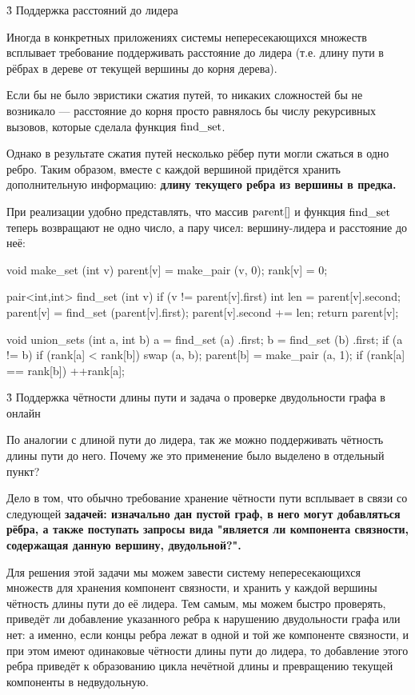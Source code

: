 \h3{ Поддержка расстояний до лидера }

Иногда в конкретных приложениях системы непересекающихся множеств всплывает требование поддерживать расстояние до лидера (т.е. длину пути в рёбрах в дереве от текущей вершины до корня дерева).

Если бы не было эвристики сжатия путей, то никаких сложностей бы не возникало --- расстояние до корня просто равнялось бы числу рекурсивных вызовов, которые сделала функция $\rm find\_set$.

Однако в результате сжатия путей несколько рёбер пути могли сжаться в одно ребро. Таким образом, вместе с каждой вершиной придётся хранить дополнительную информацию: \bf{длину текущего ребра из вершины в предка}.

При реализации удобно представлять, что массив ${\rm parent}[]$ и функция $\rm find\_set$ теперь возвращают не одно число, а пару чисел: вершину-лидера и расстояние до неё:

\code
void make_set (int v) {
	parent[v] = make_pair (v, 0);
	rank[v] = 0;
}

pair<int,int> find_set (int v) {
	if (v != parent[v].first) {
		int len = parent[v].second;
		parent[v] = find_set (parent[v].first);
		parent[v].second += len;
	}
	return parent[v];
}

void union_sets (int a, int b) {
	a = find_set (a) .first;
	b = find_set (b) .first;
	if (a != b) {
		if (rank[a] < rank[b])
			swap (a, b);
		parent[b] = make_pair (a, 1);
		if (rank[a] == rank[b])
			++rank[a];
	}
}
\endcode



\h3{ Поддержка чётности длины пути и задача о проверке двудольности графа в онлайн }

По аналогии с длиной пути до лидера, так же можно поддерживать чётность длины пути до него. Почему же это применение было выделено в отдельный пункт?

Дело в том, что обычно требование хранение чётности пути всплывает в связи со следующей \bf{задачей}: изначально дан пустой граф, в него могут добавляться рёбра, а также поступать запросы вида "является ли компонента связности, содержащая данную вершину, \bf{двудольной}?".

Для решения этой задачи мы можем завести систему непересекающихся множеств для хранения компонент связности, и хранить у каждой вершины чётность длины пути до её лидера. Тем самым, мы можем быстро проверять, приведёт ли добавление указанного ребра к нарушению двудольности графа или нет: а именно, если концы ребра лежат в одной и той же компоненте связности, и при этом имеют одинаковые чётности длины пути до лидера, то добавление этого ребра приведёт к образованию цикла нечётной длины и превращению текущей компоненты в недвудольную.

